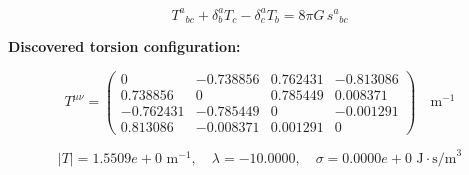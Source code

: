 
\begin{equation}
  T^a{}_{bc} + \delta^a_b T_c - \delta^a_c T_b = 8\pi G \, s^a{}_{bc}
\end{equation}

\textbf{Discovered torsion configuration:}

\begin{equation}
  T^{\mu\nu} = \begin{pmatrix}
    0 & -0.738856 & 0.762431 & -0.813086 \\
    0.738856 & 0 & 0.785449 & 0.008371 \\
    -0.762431 & -0.785449 & 0 & -0.001291 \\
    0.813086 & -0.008371 & 0.001291 & 0
  \end{pmatrix} \quad \text{m}^{-1}
\end{equation}

\begin{equation}
  |T| = 1.5509e+0 \text{ m}^{-1}, \quad
  \lambda = -10.0000, \quad
  \sigma = 0.0000e+0 \text{ J}\cdot\text{s/m}^3
\end{equation}